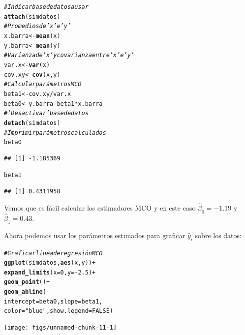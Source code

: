 \documentclass{report}\usepackage[]{graphicx}\usepackage[]{color}
\makeatletter
\newcommand{\hlnum}[1]{\textcolor[rgb]{0.686,0.059,0.569}{#1}}%
\newcommand{\hlstr}[1]{\textcolor[rgb]{0.192,0.494,0.8}{#1}}%
\newcommand{\hlcom}[1]{\textcolor[rgb]{0.678,0.584,0.686}{\textit{#1}}}%
\newcommand{\hlopt}[1]{\textcolor[rgb]{0,0,0}{#1}}%
\newcommand{\hlstd}[1]{\textcolor[rgb]{0.345,0.345,0.345}{#1}}%
\newcommand{\hlkwb}[1]{\textcolor[rgb]{0.69,0.353,0.396}{#1}}%
\newcommand{\hlkwc}[1]{\textcolor[rgb]{0.333,0.667,0.333}{#1}}%
\newcommand{\hlkwd}[1]{\textcolor[rgb]{0.737,0.353,0.396}{\textbf{#1}}}%
\newenvironment{kframe}{%
 \def\at@end@of@kframe{}%
 \ifinner\ifhmode%
  \def\at@end@of@kframe{\end{minipage}}%
  \begin{minipage}{\columnwidth}%
 \fi\fi%
 \def\FrameCommand##1{\hskip\@totalleftmargin \hskip-\fboxsep
 \colorbox{shadecolor}{##1}\hskip-\fboxsep
     \hskip-\linewidth \hskip-\@totalleftmargin \hskip\columnwidth}%
 \MakeFramed {\advance\hsize-\width
   \@totalleftmargin\z@ \linewidth\hsize
   \@setminipage}}%
 {\par\unskip\endMakeFramed%
 \at@end@of@kframe}
\newenvironment{knitrout}{}{} %
\makeatother
\begin{document}
\begin{knitrout}
\color{fgcolor}\begin{kframe}
\begin{alltt}
\hlcom{# Indicar base de datos a usar}
\hlkwd{attach}\hlstd{(simdatos)}
\hlcom{# Promedios de 'x' e 'y'}
\hlstd{x.barra} \hlkwb{<-} \hlkwd{mean}\hlstd{(x)}
\hlstd{y.barra} \hlkwb{<-} \hlkwd{mean}\hlstd{(y)}
\hlcom{# Varianza de 'x' y covarianza entre 'x' e 'y'}
\hlstd{var.x} \hlkwb{<-} \hlkwd{var}\hlstd{(x)}
\hlstd{cov.xy} \hlkwb{<-} \hlkwd{cov}\hlstd{(x,y)}
\hlcom{# Calcular parámetros MCO}
\hlstd{beta1} \hlkwb{<-} \hlstd{cov.xy}\hlopt{/}\hlstd{var.x}
\hlstd{beta0} \hlkwb{<-} \hlstd{y.barra} \hlopt{-} \hlstd{beta1}\hlopt{*}\hlstd{x.barra}
\hlcom{# 'Desactivar' base de datos}
\hlkwd{detach}\hlstd{(simdatos)}
\hlcom{# Imprimir parámetros calculados}
\hlstd{beta0}
\end{alltt}
\begin{verbatim}
## [1] -1.185369
\end{verbatim}
\begin{alltt}
\hlstd{beta1}
\end{alltt}
\begin{verbatim}
## [1] 0.4311958
\end{verbatim}
\end{kframe}
\end{knitrout}
Vemos que es fácil calcular los estimadores MCO y en este caso $\hat \beta_0 = -1.19$ y $\hat \beta_1 = 0.43$.

Ahora podemos usar los parámetros estimados para graficar $\hat y_i$ sobre los datos:

\begin{knitrout}
\color{fgcolor}\begin{kframe}
\begin{alltt}
\hlcom{# Graficar línea de regresión MCO}
\hlkwd{ggplot}\hlstd{(simdatos,} \hlkwd{aes}\hlstd{(x,y))} \hlopt{+}
  \hlkwd{expand_limits}\hlstd{(}\hlkwc{x} \hlstd{=} \hlnum{0}\hlstd{,} \hlkwc{y} \hlstd{=} \hlopt{-}\hlnum{2.5}\hlstd{)} \hlopt{+}
  \hlkwd{geom_point}\hlstd{()} \hlopt{+}
  \hlkwd{geom_abline}\hlstd{(}
    \hlkwc{intercept} \hlstd{= beta0,} \hlkwc{slope} \hlstd{= beta1,}
    \hlkwc{color} \hlstd{=} \hlstr{"blue"}\hlstd{,} \hlkwc{show.legend} \hlstd{=} \hlnum{FALSE} \hlstd{)}
\end{alltt}
\end{kframe}

{\centering \texttt{[image: figs/unnamed-chunk-11-1]} 

}



\end{knitrout}
\end{document}

